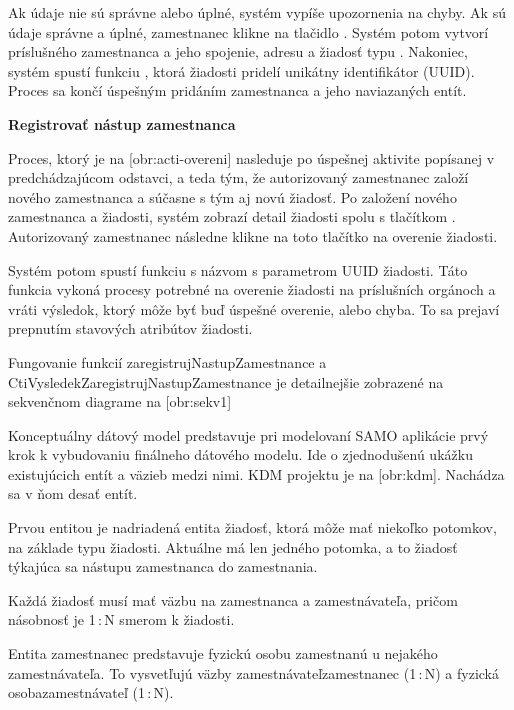 Ak údaje nie sú správne alebo úplné, systém vypíše upozornenia na chyby. Ak sú údaje správne a úplné, zamestnanec klikne na tlačidlo . Systém potom vytvorí príslušného zamestnanca a jeho spojenie, adresu a žiadosť typu . Nakoniec, systém spustí funkciu , ktorá žiadosti pridelí unikátny identifikátor (UUID). Proces sa končí úspešným pridáním zamestnanca a jeho naviazaných entít.

\blank
\start
\setupindenting[no]
\start\bf  Registrovať nástup zamestnanca\stop
\stop

Proces, ktorý je na [obr:acti-overeni] nasleduje po úspešnej aktivite popísanej v predchádzajúcom odstavci, a teda tým, že autorizovaný zamestnanec založí nového zamestnanca a súčasne s tým aj novú žiadosť. Po založení nového zamestnanca a žiadosti, systém zobrazí detail žiadosti spolu s tlačítkom . Autorizovaný zamestnanec následne klikne na toto tlačítko na overenie žiadosti. 

Systém potom spustí funkciu s názvom  s parametrom UUID žiadosti. Táto funkcia vykoná procesy potrebné na overenie žiadosti na príslušních orgánoch a vráti výsledok, ktorý môže byť buď úspešné overenie, alebo chyba. To sa prejaví prepnutím stavových atribútov žiadosti. 

Fungovanie funkcií zaregistrujNastupZamestnance a CtiVysledekZaregistrujNastupZamestnance je detailnejšie zobrazené na sekvenčnom diagrame na [obr:sekv1]


Konceptuálny dátový model predstavuje pri modelovaní SAMO aplikácie prvý krok k vybudovaniu finálneho dátového modelu. Ide o zjednodušenú ukáž\-ku existujúcich entít a väzieb medzi nimi. KDM projektu je na [obr:kdm]. Nachádza sa v ňom desať entít.

Prvou entitou je nadriadená entita žiadosť, ktorá môže mať niekoľko potomkov, na základe typu žiadosti. Aktuálne má len jedného potomka, a to žiadosť týkajúca sa nástupu zamestnanca do zamestnania. 

Každá žiadosť musí mať väzbu na zamestnanca a zamestnávateľa, pričom násobnosť je 1\,:\,N smerom k žiadosti.

Entita zamestnanec predstavuje fyzickú osobu zamestnanú u nejakého zamestnávateľa. To vysvetľujú väzby zamestnávateľ\ip zamestnanec (1\,:\,N) a fyzická osoba\ip zamestnávateľ (1\,:\,N). 

